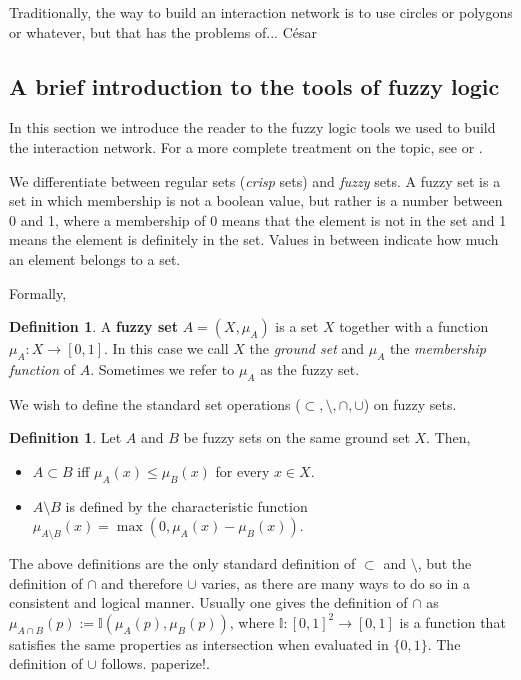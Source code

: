 \documentclass[12pt]{article}
\numberwithin{equation}{section} %
\numberwithin{figure}{section} %
\def\II{{\mathbb{I}}}
\theoremstyle{definition}
\newtheorem{definition}[theorem]{Definition}
\def\tcr#1{\textcolor{MyRed}{#1}}
\begin{document}
Traditionally, the way to build an interaction network is to use circles or polygons or whatever, but that has the problems of... \tcr{César}

\subsection{A brief introduction to the tools of fuzzy logic}
In this section we introduce the reader to the fuzzy logic tools we used to build the interaction network. For a more complete treatment on the topic, see \cite{FuzzyLogicSuperBook} or \cite{FuzzyLogicSuperBook2}. 

We differentiate between regular sets (\emph{crisp} sets)  and \emph{fuzzy} sets. A fuzzy set is a set in which membership is not a boolean value, but rather is a number between 0 and 1, where a membership of 0 means that the element is not in the set and 1 means the element is definitely in the set. Values in between indicate how much an element belongs to a set.

Formally,
\begin{definition}
	A \textbf{fuzzy set} $A=(X,\mu_A)$ is a set $X$ together with a function $\mu_A:X \to [0,1]$. In this case we call $X$ the \emph{ground set} and $\mu_A$ the \emph{membership function} of $A$. Sometimes we refer to $\mu_A$ as the fuzzy set.
\end{definition}

We wish to define the standard set operations ($\subset,\setminus,\cap,\cup$) on fuzzy sets. 

\begin{definition}
	Let $A$ and $B$ be fuzzy sets on the same ground set $X$. Then,
	\begin{itemize}
		\item $A \subset B$ iff $\mu_A(x) \leq \mu_B(x)$ for every $x\in X$.
		\item $A\setminus B$ is defined by the characteristic function $\mu_{A\setminus B}(x) = \max(0,\mu_A(x)-\mu_B(x))$.
	\end{itemize}
\end{definition}

The above definitions are the only standard definition of $\subset$ and $\setminus$, but the definition of $\cap$ and therefore $\cup$ varies, as there are many ways to do so in a consistent and logical manner. Usually one gives the definition of $\cap$ as $\mu_{A\cap B}(p) := \II(\mu_A(p),\mu_B(p))$, where  $\II : [0,1]^2 \to [0,1]$ is a function that satisfies the same properties as intersection when evaluated in $\{0,1\}$. The definition of $\cup$ follows. \tcr{paperize!}. 
\end{document}
